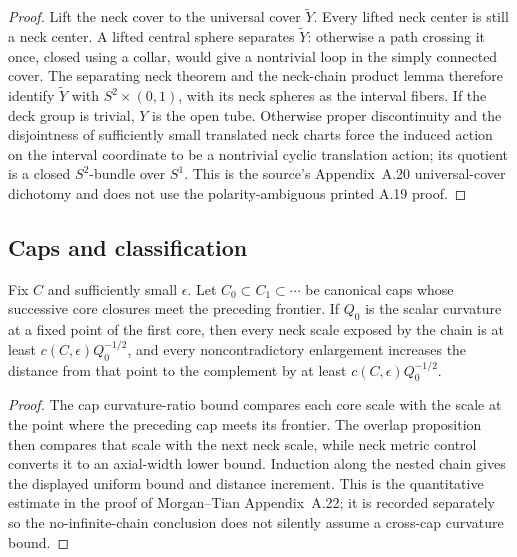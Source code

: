 \begin{proof}
Lift the neck cover to the universal cover $\widetilde Y$.  Every lifted neck
center is still a neck center.  A lifted central sphere separates
$\widetilde Y$: otherwise a path crossing it once, closed using a collar,
would give a nontrivial loop in the simply connected cover.  The separating
neck theorem and the neck-chain product lemma therefore identify
$\widetilde Y$ with $S^2\times(0,1)$, with its neck spheres as the interval
fibers.  If the deck group is trivial, $Y$ is the open tube.  Otherwise
proper discontinuity and the disjointness of sufficiently small translated
neck charts force the induced action on the interval coordinate to be a
nontrivial cyclic translation action; its quotient is a closed
$S^2$-bundle over $S^1$.  This is the source's Appendix~A.20 universal-cover
dichotomy and does not use the polarity-ambiguous printed A.19 proof.
\end{proof}

\subsection{Caps and classification}

\begin{lemma}
\label{lem:nested-cap-scale-comparison}
\notready
Fix $C$ and sufficiently small $\epsilon$.  Let
$C_0\subset C_1\subset\cdots$ be canonical caps whose successive core
closures meet the preceding frontier.  If $Q_0$ is the scalar
curvature at a fixed point of the first core, then every neck scale exposed by
the chain is at least $c(C,\epsilon)Q_0^{-1/2}$, and every noncontradictory
enlargement increases the distance from that point to the complement by at
least $c(C,\epsilon)Q_0^{-1/2}$.
\end{lemma}

\begin{proof}
The cap curvature-ratio bound compares each core scale with the scale at the
point where the preceding cap meets its frontier.  The overlap proposition
then compares that scale with the next neck scale, while neck metric control
converts it to an axial-width lower bound.  Induction along the nested chain
gives the displayed uniform bound and distance increment.  This is the
quantitative estimate in the proof of Morgan--Tian Appendix~A.22; it is
recorded separately so the no-infinite-chain conclusion does not silently
assume a cross-cap curvature bound.
\end{proof}

